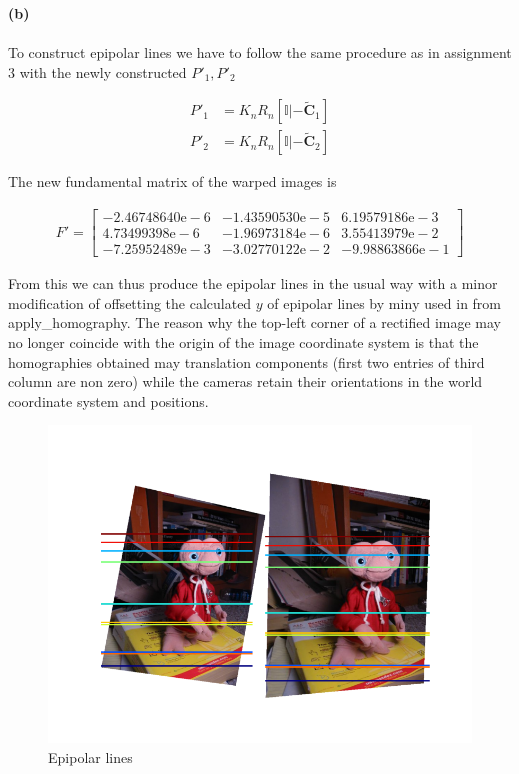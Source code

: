 \begin{homeworkProblem}
  \textbf{(b)}
  \\
  \\

  To construct epipolar lines we have to follow the same procedure as in
  assignment 3 with the newly constructed $P'_1,P'_2$

  \begin{align}
    P'_1 &= K_nR_n [\mathbb{I} | -\tilde{\mathbf{C}}_1]\\
    P'_2 &= K_nR_n [\mathbb{I} | -\tilde{\mathbf{C}}_2]
  \end{align}

  The new fundamental matrix of the warped images is

  \begin{align}
    F' = \begin{bmatrix}
      -2.46748640\mathrm{e-}6 & -1.43590530\mathrm{e-}5 & 6.19579186\mathrm{e-}3\\
      4.73499398\mathrm{e-}6 & -1.96973184\mathrm{e-}6 & 3.55413979\mathrm{e-}2\\
      -7.25952489\mathrm{e-}3 & -3.02770122\mathrm{e-}2 & -9.98863866\mathrm{e-}1
    \end{bmatrix}
  \end{align}

  From this we can thus produce the epipolar lines in the usual way with a minor
  modification of offsetting the calculated $y$ of epipolar lines by
  $\mathrm{miny}$ used in from apply\_homography. The reason why the top-left corner
  of a rectified image may no longer coincide with the origin of the image coordinate system
  is that the homographies obtained may translation components (first two entries of third
  column are non zero) while the cameras retain their orientations
  in the world coordinate system and positions.

  \begin{figure}[H]
    \centering
    \includegraphics[width=1.0\linewidth]{images/epipolar_lines.png}
    \caption{Epipolar lines}
  \end{figure}

\end{homeworkProblem}



